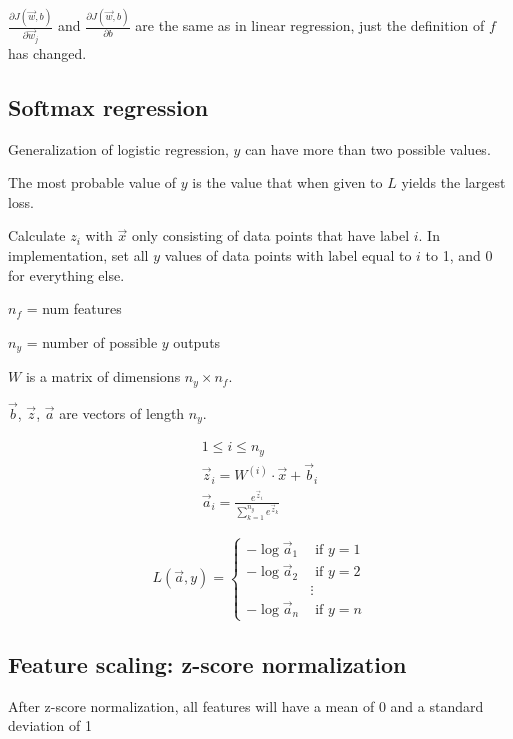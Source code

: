 \documentclass[12pt]{article}
\begin{document}
$\frac{\partial J(\vec{w},b)}{\partial \vec{w}_j}$ and $\frac{\partial J(\vec{w},b)}{\partial b}$ are the same as in linear regression, just the definition of $f$ has changed.

\subsection{Softmax regression}

Generalization of logistic regression, $y$ can have more than two possible values.

The most probable value of $y$ is the value that when given to $L$ yields the largest loss.

Calculate $z_i$ with $\vec{x}$ only consisting of data points that have label $i$. In implementation, set all $y$ values of data points with label equal to $i$ to 1, and 0 for everything else.

$n_f$ = num features

$n_y$ = number of possible $y$ outputs

$W$ is a matrix of dimensions $n_y \times n_f$.

$\vec{b}$, $\vec{z}$, $\vec{a}$ are vectors of length $n_y$.

\begin{gather*}
    1 \leq i \leq n_y\\
    \vec{z}_i = W^{(i)} \cdot \vec{x} + \vec{b}_i\\
    \vec{a}_i = \frac{e^{\vec{z}_i}}{\sum_{k=1}^{n_y} e^{\vec{z}_k}}
\end{gather*}

\begin{equation}
L(\vec{a}, y) =
  \left\{
    \begin{aligned}
    -\log \vec{a}_1 &\text{ if } y = 1\\
    -\log \vec{a}_2 &\text{ if } y = 2\\
    & \vdots\\
    -\log \vec{a}_n &\text{ if } y = n
    \end{aligned}
   \right.
\end{equation}

\subsection{Feature scaling: z-score normalization}

After z-score normalization, all features will have a mean of 0 and a standard deviation of 1
\end{document}
